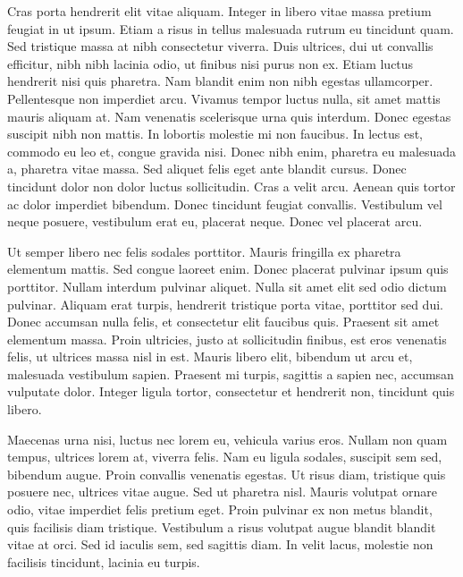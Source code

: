 \documentclass{novel}
\begin{document}
Cras porta hendrerit elit vitae aliquam. Integer in libero vitae massa pretium feugiat in ut ipsum. Etiam a risus in tellus malesuada rutrum eu tincidunt quam. Sed tristique massa at nibh consectetur viverra. Duis ultrices, dui ut convallis efficitur, nibh nibh lacinia odio, ut finibus nisi purus non ex. Etiam luctus hendrerit nisi quis pharetra. Nam blandit enim non nibh egestas ullamcorper. Pellentesque non imperdiet arcu. Vivamus tempor luctus nulla, sit amet mattis mauris aliquam at. Nam venenatis scelerisque urna quis interdum. Donec egestas suscipit nibh non mattis. In lobortis molestie mi non faucibus. In lectus est, commodo eu leo et, congue gravida nisi. Donec nibh enim, pharetra eu malesuada a, pharetra vitae massa. Sed aliquet felis eget ante blandit cursus. Donec tincidunt dolor non dolor luctus sollicitudin. Cras a velit arcu. Aenean quis tortor ac dolor imperdiet bibendum. Donec tincidunt feugiat convallis. Vestibulum vel neque posuere, vestibulum erat eu, placerat neque. Donec vel placerat arcu.

Ut semper libero nec felis sodales porttitor. Mauris fringilla ex pharetra elementum mattis. Sed congue laoreet enim. Donec placerat pulvinar ipsum quis porttitor. Nullam interdum pulvinar aliquet. Nulla sit amet elit sed odio dictum pulvinar. Aliquam erat turpis, hendrerit tristique porta vitae, porttitor sed dui. Donec accumsan nulla felis, et consectetur elit faucibus quis. Praesent sit amet elementum massa. Proin ultricies, justo at sollicitudin finibus, est eros venenatis felis, ut ultrices massa nisl in est. Mauris libero elit, bibendum ut arcu et, malesuada vestibulum sapien. Praesent mi turpis, sagittis a sapien nec, accumsan vulputate dolor. Integer ligula tortor, consectetur et hendrerit non, tincidunt quis libero.

Maecenas urna nisi, luctus nec lorem eu, vehicula varius eros. Nullam non quam tempus, ultrices lorem at, viverra felis. Nam eu ligula sodales, suscipit sem sed, bibendum augue. Proin convallis venenatis egestas. Ut risus diam, tristique quis posuere nec, ultrices vitae augue. Sed ut pharetra nisl. Mauris volutpat ornare odio, vitae imperdiet felis pretium eget. Proin pulvinar ex non metus blandit, quis facilisis diam tristique. Vestibulum a risus volutpat augue blandit blandit vitae at orci. Sed id iaculis sem, sed sagittis diam. In velit lacus, molestie non facilisis tincidunt, lacinia eu turpis.
\end{document}
